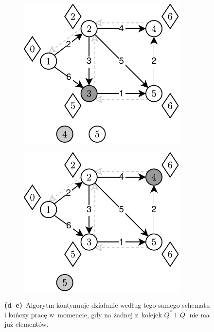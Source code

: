 \begin{figure}[!htbp]
	\ContinuedFloat
	\null\hfill
	\begin{subfigure}[b]{0.3\textwidth}
		\includegraphics[width=\textwidth]{Chapter_III/GRAPH-GROWTH-2Q-Example/d.pdf}
		\caption{}
		\label{fig:exampleDQQ:d}
	\end{subfigure}
	\hfill
	\begin{subfigure}[b]{0.3\textwidth}
		\includegraphics[width=\textwidth]{Chapter_III/GRAPH-GROWTH-2Q-Example/e.pdf}
		\caption{}
		\label{fig:exampleDQQ:e}
	\end{subfigure}
	\hfill\null
	\caption{
		\textbf{(d--e)}~Algorytm kontynuuje działanie według tego samego schematu i kończy pracę w~momencie, gdy na żadnej z~kolejek $Q^{''}$ i~$Q^{'}$ nie ma już elementów.
	}
	\label{fig:exampleDQQ2}
\end{figure}



